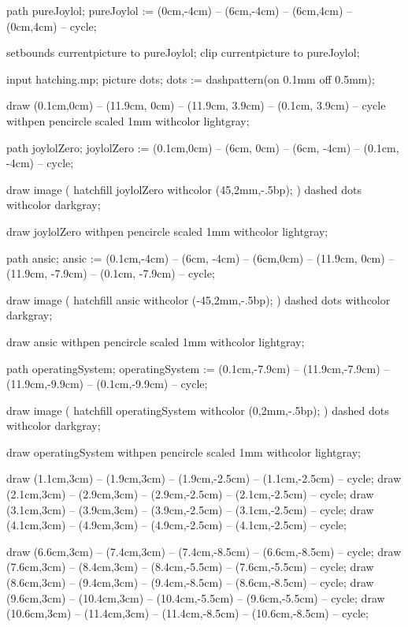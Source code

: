 path pureJoylol;
pureJoylol := (0cm,-4cm) -- (6cm,-4cm) -- (6cm,4cm) -- (0cm,4cm) -- cycle;

setbounds currentpicture to pureJoylol;
clip currentpicture to pureJoylol;

\stopMPcode\egroup

\bgroup\startMPcode
input hatching.mp;
picture dots; dots := dashpattern(on 0.1mm off 0.5mm);


draw (0.1cm,0cm) -- (11.9cm, 0cm) -- (11.9cm, 3.9cm) -- (0.1cm, 3.9cm) -- cycle
  withpen pencircle scaled 1mm
  withcolor lightgray;

path joylolZero;
joylolZero := (0.1cm,0cm) -- (6cm, 0cm) --
  (6cm, -4cm) -- (0.1cm, -4cm) -- cycle;

draw image (
  hatchfill joylolZero
    withcolor (45,2mm,-.5bp);
) dashed dots withcolor darkgray;

draw joylolZero
  withpen pencircle scaled 1mm
  withcolor lightgray;

path ansic;
ansic := (0.1cm,-4cm) -- (6cm, -4cm) --
     (6cm,0cm) -- (11.9cm, 0cm) -- (11.9cm, -7.9cm) -- (0.1cm, -7.9cm) -- cycle;

draw image (
  hatchfill ansic
    withcolor (-45,2mm,-.5bp);
) dashed dots withcolor darkgray;

draw ansic
  withpen pencircle scaled 1mm
  withcolor lightgray;

path operatingSystem;
operatingSystem := (0.1cm,-7.9cm) -- (11.9cm,-7.9cm) --
  (11.9cm,-9.9cm) -- (0.1cm,-9.9cm) -- cycle;
  
draw image (
  hatchfill operatingSystem
    withcolor (0,2mm,-.5bp);
) dashed dots withcolor darkgray;

draw operatingSystem
  withpen pencircle scaled 1mm
  withcolor lightgray;


draw (1.1cm,3cm) -- (1.9cm,3cm) -- (1.9cm,-2.5cm) -- (1.1cm,-2.5cm) -- cycle;
draw (2.1cm,3cm) -- (2.9cm,3cm) -- (2.9cm,-2.5cm) -- (2.1cm,-2.5cm) -- cycle;
draw (3.1cm,3cm) -- (3.9cm,3cm) -- (3.9cm,-2.5cm) -- (3.1cm,-2.5cm) -- cycle;
draw (4.1cm,3cm) -- (4.9cm,3cm) -- (4.9cm,-2.5cm) -- (4.1cm,-2.5cm) -- cycle;

draw (6.6cm,3cm) -- (7.4cm,3cm) -- (7.4cm,-8.5cm) -- (6.6cm,-8.5cm) -- cycle;
draw (7.6cm,3cm) -- (8.4cm,3cm) -- (8.4cm,-5.5cm) -- (7.6cm,-5.5cm) -- cycle;
draw (8.6cm,3cm) -- (9.4cm,3cm) -- (9.4cm,-8.5cm) -- (8.6cm,-8.5cm) -- cycle;
draw (9.6cm,3cm) -- (10.4cm,3cm) -- (10.4cm,-5.5cm) -- (9.6cm,-5.5cm) -- cycle;
draw (10.6cm,3cm) -- (11.4cm,3cm) -- (11.4cm,-8.5cm) -- (10.6cm,-8.5cm) -- cycle;

